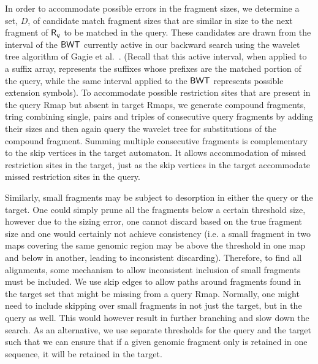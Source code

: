In order to accommodate possible errors in the fragment sizes, we determine a set, $D$, of candidate match fragment sizes that are similar in size to the next fragment of $\mbox{\rm {\sf R}}_q$ to be matched in the query. These candidates are drawn from the interval of the $\mbox{\rm {\sf BWT}}$ currently active in our backward search using the wavelet tree algorithm of Gagie et al.~\cite{GNPtcs11}.  (Recall that this active interval, when applied to a suffix array, represents the suffixes whose prefixes are the matched portion of the query, while the same interval applied to the $\mbox{\rm {\sf BWT}}$ represents possible extension symbols). To accommodate possible restriction sites that are present in the query Rmap but absent in target Rmaps, we generate compound fragments, tring combining single, pairs and triples of consecutive query fragments by adding their sizes and then again query the wavelet tree for substitutions of the compound fragment.  Summing multiple consecutive fragments is complementary to the skip vertices in the target automaton.  It allows accommodation of missed restriction sites in the target, just as the skip vertices in the target accommodate missed restriction sites in the query.  

Similarly, small fragments may be subject to desorption in either the query or the target.  One could simply prune all the fragments below a certain threshold size, however due to the sizing error, one cannot discard based on the true fragment size and one would certainly not achieve consistency (i.e. a small fragment in two maps covering the same genomic region may be above the threshold in one map and below in another, leading to inconsistent discarding).  Therefore, to find all alignments, some mechanism to allow inconsistent inclusion of small fragments must be included.  We use skip edges to allow paths around fragments found in the target set that might be missing from a query Rmap.  Normally, one might need to include skipping over small fragments in not just the target, but in the query as well. This would however result in further branching and slow down the search.  As an alternative, we use separate thresholds for the query and the target such that we can ensure that if a given genomic fragment only is retained in one sequence, it will be retained in the target. 

